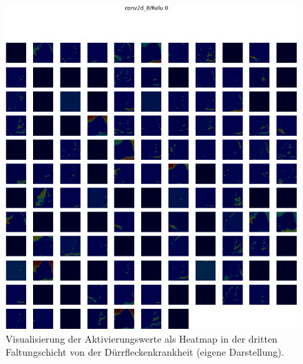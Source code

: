 \begin{figure}[h!]
	\centering
	\includegraphics[width=\textwidth]{visualisierungen/early/heatmap_mit/conv2d_8.png}
	\caption{Visualisierung der Aktivierungswerte als Heatmap in der dritten Faltungschicht von der Dürrfleckenkrankheit (eigene Darstellung).}
	\label{}
\end{figure}

